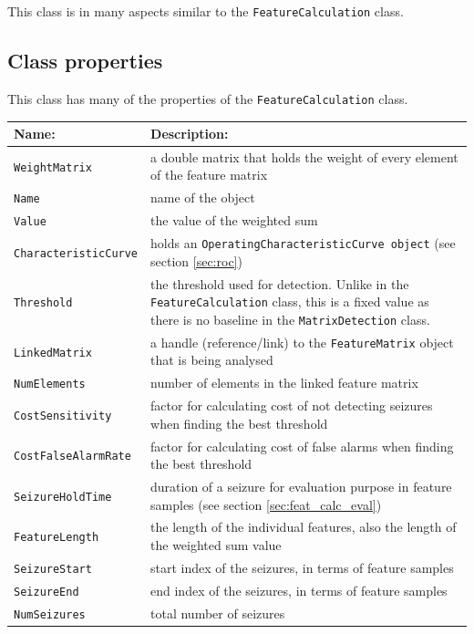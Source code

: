 \documentclass[usletter, 11pt]{extarticle}
\begin{document}
This class is in many aspects similar to the \verb|FeatureCalculation| class.

\subsection{Class properties}

This class has many of the properties of the \verb|FeatureCalculation| class.

\begin{center}
	\begin{longtable}{p{5cm}|p{12cm}}
	\textbf{Name:} & \textbf{Description:} \\ \hline
	\texttt{WeightMatrix} & a double matrix that holds the weight of every element of the feature matrix \\
	\texttt{Name} & name of the object \\
	\texttt{Value} & the value of the weighted sum \\
    \texttt{CharacteristicCurve} &  holds an \verb|OperatingCharacteristicCurve object| (see section \ref{sec:roc})  \\
        
    
    \texttt{Threshold} & the threshold used for detection. Unlike in the \verb|FeatureCalculation| class, this is a fixed value as there is no baseline in the \verb|MatrixDetection| class. \\
    
    \texttt{LinkedMatrix} & a handle (reference/link) to the \verb|FeatureMatrix| object that is being analysed \\
    \texttt{NumElements} & number of elements in the linked feature matrix \\
    
    \texttt{CostSensitivity} & factor for calculating cost of not detecting seizures when finding the best threshold \\
    \texttt{CostFalseAlarmRate} & factor for calculating cost of false alarms when finding the best threshold \\
    \texttt{SeizureHoldTime} & duration of a seizure for evaluation purpose in feature samples (see section \ref{sec:feat_calc_eval}) \\

    \texttt{FeatureLength} & the length of the individual features, also the length of the weighted sum value \\
    
    \texttt{SeizureStart} & start index of the seizures, in terms of feature samples \\
    \texttt{SeizureEnd} & end index of the seizures, in terms of feature samples \\
    \texttt{NumSeizures} & total number of seizures \\
	

\end{longtable}
\end{center}
\end{document}
